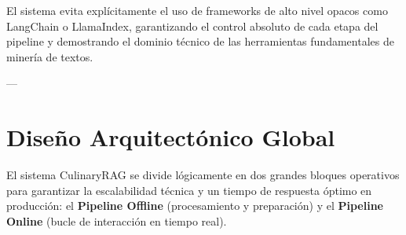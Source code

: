 \documentclass[11pt,a4paper]{article}
\begin{document}
El sistema evita explícitamente el uso de frameworks de alto nivel opacos como LangChain o LlamaIndex, garantizando el control absoluto de cada etapa del pipeline y demostrando el dominio técnico de las herramientas fundamentales de minería de textos.

---

\section{Diseño Arquitectónico Global}

El sistema CulinaryRAG se divide lógicamente en dos grandes bloques operativos para garantizar la escalabilidad técnica y un tiempo de respuesta óptimo en producción: el \textbf{Pipeline Offline} (procesamiento y preparación) y el \textbf{Pipeline Online} (bucle de interacción en tiempo real).
\end{document}
